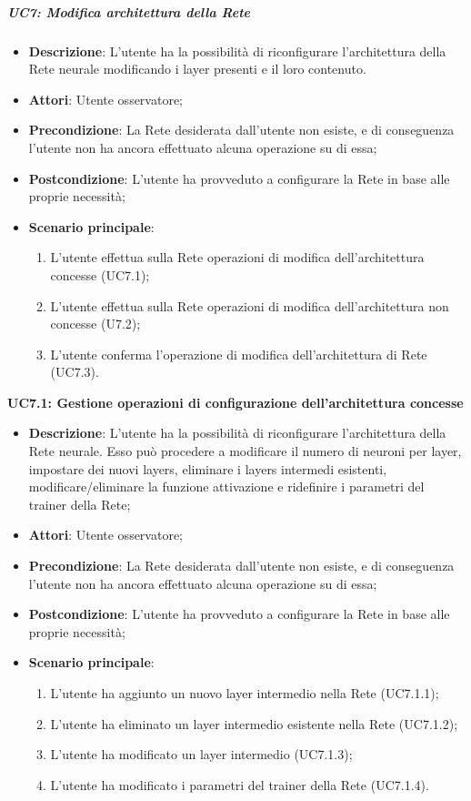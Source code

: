 \subparagraph{UC7: Modifica architettura della Rete}\mbox{}
\label{UC7: Modifica architettura della Rete}
\noindent
\begin{itemize}
\item \textbf{Descrizione}: L'utente ha la possibilit\`a di riconfigurare l'architettura della Rete neurale modificando i layer presenti e il loro contenuto.
\item \textbf{Attori}: Utente osservatore;
\item \textbf{Precondizione}: La Rete desiderata dall'utente non esiste, e di conseguenza l'utente non ha ancora effettuato alcuna operazione su di essa;
\item \textbf{Postcondizione}: L'utente ha provveduto a configurare la Rete in base alle proprie necessit\`a;
\item \textbf{Scenario principale}:
\begin{enumerate}
\item L'utente effettua sulla Rete operazioni di modifica dell'architettura concesse (UC7.1);
\item L'utente effettua sulla Rete operazioni di modifica dell'architettura non concesse (U7.2);
\item L'utente conferma l'operazione di modifica dell'architettura di Rete (UC7.3).
\end{enumerate}
\end{itemize}

\textbf{UC7.1: Gestione operazioni di configurazione dell'architettura concesse}
\label{UC7.1: Gestione operazioni di configurazione dell'architettura concesse}
\noindent
\begin{itemize}
\item \textbf{Descrizione}: L'utente ha la possibilit\`a di riconfigurare l'architettura della Rete neurale. Esso pu\`o procedere a modificare il numero di neuroni per layer, impostare dei nuovi layers, eliminare i layers intermedi esistenti, modificare/eliminare la funzione attivazione e ridefinire i parametri del trainer della Rete;
\item \textbf{Attori}: Utente osservatore;
\item \textbf{Precondizione}: La Rete desiderata dall'utente non esiste, e di conseguenza l'utente non ha ancora effettuato alcuna operazione su di essa;
\item \textbf{Postcondizione}: L'utente ha provveduto a configurare la Rete in base alle proprie necessit\`a;
\item \textbf{Scenario principale}:
\begin{enumerate}
\item L'utente ha aggiunto un nuovo layer intermedio nella Rete (UC7.1.1);
\item L'utente ha eliminato un layer intermedio esistente nella Rete (UC7.1.2);
\item L'utente ha modificato un layer intermedio (UC7.1.3);
\item L'utente ha modificato i parametri del trainer della Rete (UC7.1.4).
\end{enumerate}
\end{itemize}

